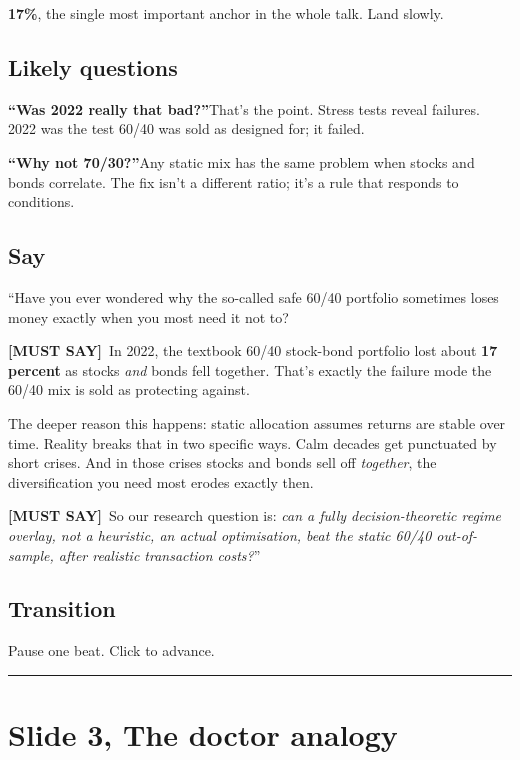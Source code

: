 \documentclass[11pt]{article}
\newcommand{\mustsay}[1]{\textcolor{must}{\textbf{[MUST SAY]}}\ #1}
\begin{document}
\textbf{17\%}, the single most important anchor in the whole talk. Land slowly.

\subsection*{Likely questions}

\textbf{``Was 2022 really that bad?''}\quad That's the point. Stress tests reveal failures. 2022 was the test 60/40 was sold as designed for; it failed.

\textbf{``Why not 70/30?''}\quad Any static mix has the same problem when stocks and bonds correlate. The fix isn't a different ratio; it's a rule that responds to conditions.

\subsection*{Say}

``Have you ever wondered why the so-called safe 60/40 portfolio sometimes loses money exactly when you most need it not to?

\mustsay{In 2022, the textbook 60/40 stock-bond portfolio lost about \textbf{17 percent} as stocks \emph{and} bonds fell together. That's exactly the failure mode the 60/40 mix is sold as protecting against.}

The deeper reason this happens: static allocation assumes returns are stable over time. Reality breaks that in two specific ways. Calm decades get punctuated by short crises. And in those crises stocks and bonds sell off \emph{together}, the diversification you need most erodes exactly then.

\mustsay{So our research question is: \emph{can a fully decision-theoretic regime overlay, not a heuristic, an actual optimisation, beat the static 60/40 out-of-sample, after realistic transaction costs?}''}

\subsection*{Transition}

Pause one beat. Click to advance.

\bigskip\hrule

\section*{Slide 3, The doctor analogy}
\end{document}
